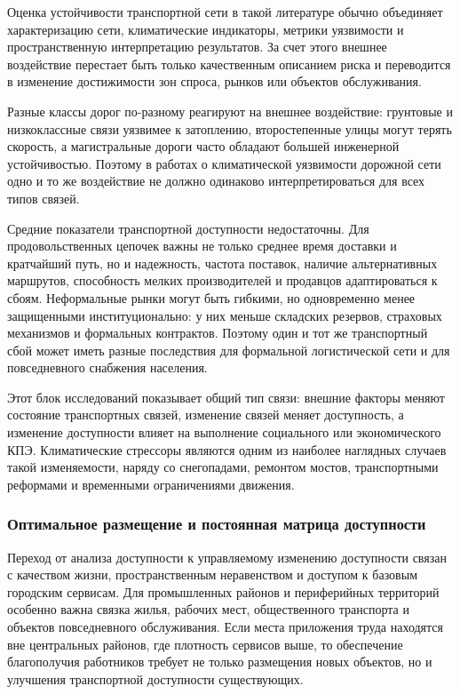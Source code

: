 Оценка устойчивости транспортной сети в такой литературе обычно объединяет характеризацию сети, климатические индикаторы, метрики уязвимости и пространственную интерпретацию результатов. За счет этого внешнее воздействие перестает быть только качественным описанием риска и переводится в изменение достижимости зон спроса, рынков или объектов обслуживания.

Разные классы дорог по-разному реагируют на внешнее воздействие: грунтовые и низкоклассные связи уязвимее к затоплению, второстепенные улицы могут терять скорость, а магистральные дороги часто обладают большей инженерной устойчивостью. Поэтому в работах о климатической уязвимости дорожной сети одно и то же воздействие не должно одинаково интерпретироваться для всех типов связей.

Средние показатели транспортной доступности недостаточны. Для продовольственных цепочек важны не только среднее время доставки и кратчайший путь, но и надежность, частота поставок, наличие альтернативных маршрутов, способность мелких производителей и продавцов адаптироваться к сбоям. Неформальные рынки могут быть гибкими, но одновременно менее защищенными институционально: у них меньше складских резервов, страховых механизмов и формальных контрактов. Поэтому один и тот же транспортный сбой может иметь разные последствия для формальной логистической сети и для повседневного снабжения населения.

Этот блок исследований показывает общий тип связи: внешние факторы меняют состояние транспортных связей, изменение связей меняет доступность, а изменение доступности влияет на выполнение социального или экономического КПЭ. Климатические стрессоры являются одним из наиболее наглядных случаев такой изменяемости, наряду со снегопадами, ремонтом мостов, транспортными реформами и временными ограничениями движения.

\subsubsection{Оптимальное размещение и постоянная матрица доступности}
\label{subsubsec:network-improvement-placement}

Переход от анализа доступности к управляемому изменению доступности связан с качеством жизни, пространственным неравенством и доступом к базовым городским сервисам. Для промышленных районов и периферийных территорий особенно важна связка жилья, рабочих мест, общественного транспорта и объектов повседневного обслуживания. Если места приложения труда находятся вне центральных районов, где плотность сервисов выше, то обеспечение благополучия работников требует не только размещения новых объектов, но и улучшения транспортной доступности существующих.

